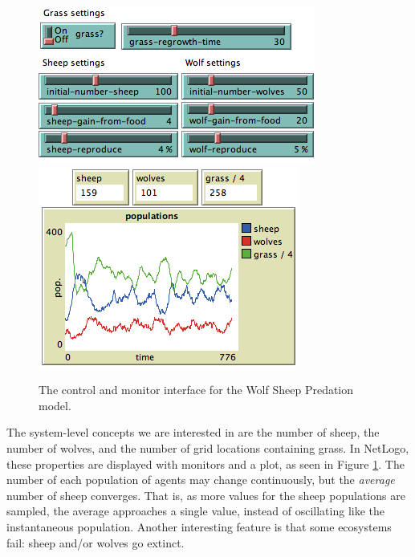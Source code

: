 \begin{figure}[ht]
\centering
\includegraphics[scale=.66667]{images/wolfsheepcontrols.png}
\includegraphics[scale=.66667]{images/wolfsheepmons.png}
\caption{The control and monitor interface for the Wolf Sheep Predation model.}
\label{fig:wolfsheepui}
\end{figure}

The system-level concepts we are interested in are the number of sheep, the number of wolves, and the number of grid locations containing grass.
In NetLogo, these properties are displayed with monitors and a plot, as seen in Figure \ref{fig:wolfsheepui}.
The number of each population of agents may change continuously, but the \textit{average} number of sheep converges.
That is, as more values for the sheep populations are sampled, the average approaches a single value, instead of oscillating like the instantaneous population.
Another interesting feature is that some ecosystems fail: sheep and/or wolves go extinct.

